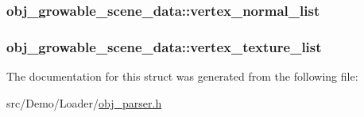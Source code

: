 \hypertarget{structobj__growable__scene__data_a8434f1f1123eaf06a4e87f7a4c157527}{
\subsubsection[{vertex\+\_\+normal\+\_\+list}]{ obj\+\_\+growable\+\_\+scene\+\_\+data\+::vertex\+\_\+normal\+\_\+list}}\label{structobj__growable__scene__data_a8434f1f1123eaf06a4e87f7a4c157527}
\hypertarget{structobj__growable__scene__data_a85ee455560d2f8c8910257bb4b96c5bf}{
\subsubsection[{vertex\+\_\+texture\+\_\+list}]{ obj\+\_\+growable\+\_\+scene\+\_\+data\+::vertex\+\_\+texture\+\_\+list}}\label{structobj__growable__scene__data_a85ee455560d2f8c8910257bb4b96c5bf}


The documentation for this struct was generated from the following file\+:\begin{DoxyCompactItemize}
\item 
src/\+Demo/\+Loader/\hyperlink{obj__parser_8h}{obj\+\_\+parser.\+h}\end{DoxyCompactItemize}
